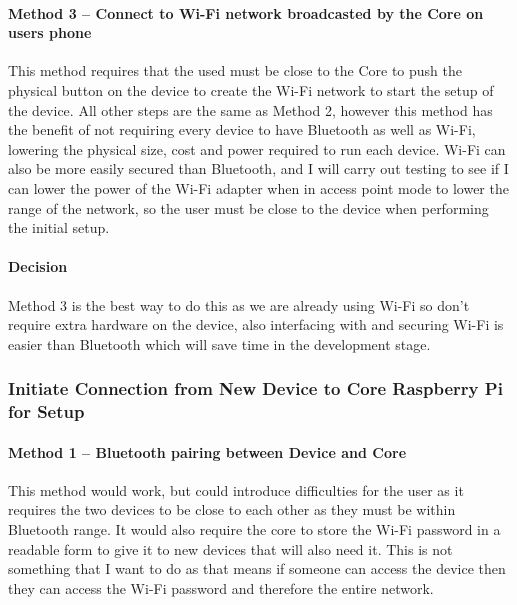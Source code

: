 \paragraph*{Method 3 – Connect to Wi-Fi network broadcasted by the Core on users phone}
This method requires that the used must be close to the Core to push the physical button on the device to create the Wi-Fi network to start the setup of the device. All other steps are the same as Method 2, however this method has the benefit of not requiring every device to have Bluetooth as well as Wi-Fi, lowering the physical size, cost and power required to run each device. Wi-Fi can also be more easily secured than Bluetooth, and I will carry out testing to see if I can lower the power of the Wi-Fi adapter when in access point mode to lower the range of the network, so the user must be close to the device when performing the initial setup.

\paragraph*{Decision}
Method 3 is the best way to do this as we are already using Wi-Fi so don't require extra hardware on the device, also interfacing with and securing Wi-Fi is easier than Bluetooth which will save time in the development stage. 

\subsubsection*{Initiate Connection from New Device to Core Raspberry Pi for Setup}

\paragraph*{Method 1 – Bluetooth pairing between Device and Core}
This method would work, but could introduce difficulties for the user as it requires the two devices to be close to each other as they must be within Bluetooth range. It would also require the core to store the Wi-Fi password in a readable form to give it to new devices that will also need it. This is not something that I want to do as that means if someone can access the device then they can access the Wi-Fi password and therefore the entire network.


